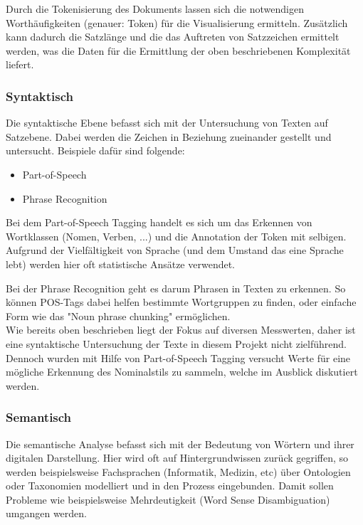 Durch die Tokenisierung des Dokuments lassen sich die notwendigen Worthäufigkeiten (genauer: Token)  für die Visualisierung ermitteln. Zusätzlich kann dadurch die Satzlänge und die das Auftreten von Satzzeichen ermittelt werden, was die Daten für die Ermittlung der oben beschriebenen Komplexität liefert.

\subsubsection{Syntaktisch}

Die syntaktische Ebene befasst sich mit der Untersuchung von Texten auf Satzebene. Dabei werden die Zeichen in Beziehung zueinander gestellt und untersucht. Beispiele dafür sind folgende:\\

\begin{itemize}
\item Part-of-Speech
\item Phrase Recognition
\end{itemize}

Bei dem Part-of-Speech Tagging handelt es sich um das Erkennen von Wortklassen (Nomen, Verben, ...) und die Annotation der Token mit selbigen. Aufgrund der Vielfältigkeit von Sprache (und dem Umstand das eine Sprache lebt) werden hier oft statistische Ansätze verwendet. 

Bei der Phrase Recognition geht es darum Phrasen in Texten zu erkennen. So können POS-Tags dabei helfen bestimmte Wortgruppen zu finden, oder einfache Form wie das "Noun phrase chunking" ermöglichen.\\

Wie bereits oben beschrieben liegt der Fokus auf diversen Messwerten, daher ist eine syntaktische Untersuchung der Texte in diesem Projekt nicht zielführend. Dennoch wurden mit Hilfe von Part-of-Speech Tagging versucht Werte für eine mögliche Erkennung des Nominalstils zu sammeln, welche im Ausblick diskutiert werden.

\subsubsection{Semantisch}
Die semantische Analyse befasst sich mit der Bedeutung von Wörtern und ihrer digitalen Darstellung. Hier wird oft auf Hintergrundwissen zurück gegriffen, so werden beispielsweise Fachsprachen (Informatik, Medizin, etc) über Ontologien oder Taxonomien modelliert und in den Prozess eingebunden. Damit sollen Probleme wie beispielsweise Mehrdeutigkeit (Word Sense Disambiguation) umgangen werden. \\

